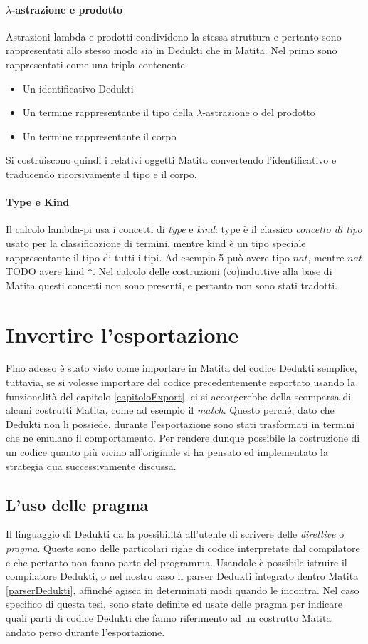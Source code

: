 \documentclass[12pt,a4paper]{report}
\begin{document}
\paragraph{$\lambda$-astrazione e prodotto}
Astrazioni lambda e prodotti condividono la stessa struttura e pertanto sono
rappresentati allo stesso modo sia in Dedukti che in Matita.
Nel primo sono rappresentati come una tripla contenente
\begin{itemize}
  \item Un identificativo Dedukti
  \item Un termine rappresentante il tipo della $\lambda$-astrazione o del prodotto
  \item Un termine rappresentante il corpo
\end{itemize}
Si costruiscono quindi i relativi oggetti Matita convertendo l'identificativo
e traducendo ricorsivamente il tipo e il corpo.

\paragraph{Type e Kind}
Il calcolo lambda-pi usa i concetti di \textit{type} e \textit{kind}: type è
il classico \textit{concetto di tipo} usato per la classificazione di termini,
mentre kind è un tipo speciale rappresentante il tipo di tutti i tipi. Ad 
esempio 5 può avere tipo $nat$, mentre $nat$ TODO avere kind $*$. Nel 
calcolo delle costruzioni (co)induttive alla base di Matita questi concetti
non sono presenti, e pertanto non sono stati tradotti. %

\section{Invertire l'esportazione}
Fino adesso è stato visto come importare in Matita del codice Dedukti semplice,
tuttavia, se si volesse importare del codice precedentemente esportato usando
la funzionalità del capitolo \ref{capitoloExport}, ci si accorgerebbe della 
scomparsa di alcuni costrutti Matita, come ad esempio il \textit{match}. Questo
perché, dato che Dedukti non li possiede, durante l'esportazione sono stati
trasformati in termini che ne emulano il comportamento. Per rendere dunque possibile
la costruzione di un codice quanto più vicino all'originale si ha pensato ed 
implementato la strategia qua successivamente discussa.

\subsection{L'uso delle pragma}
Il linguaggio di Dedukti da la possibilità all'utente di scrivere delle 
\textit{direttive} o \textit{pragma}. Queste sono delle particolari righe di
codice interpretate dal compilatore e che pertanto non fanno parte del programma.
Usandole è possibile istruire il compilatore Dedukti, o nel nostro caso il parser
Dedukti integrato dentro Matita \ref{parserDedukti}, affinché agisca in determinati
modi quando le incontra. 
Nel caso specifico di questa tesi, sono state definite ed usate delle pragma
per indicare quali parti di codice Dedukti che fanno riferimento ad un costrutto 
Matita andato perso durante l'esportazione.
\end{document}
